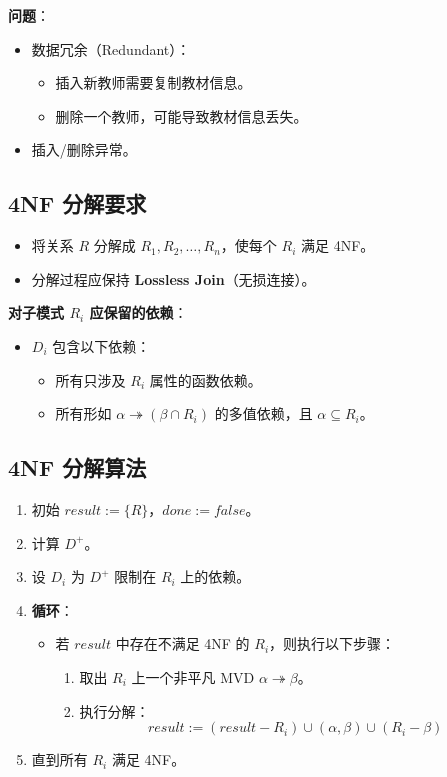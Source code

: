 \textbf{问题}：

\begin{itemize}
    \item 数据冗余（Redundant）：
    \begin{itemize}
        \item 插入新教师需要复制教材信息。
        \item 删除一个教师，可能导致教材信息丢失。
    \end{itemize}
    \item 插入/删除异常。
\end{itemize}

\subsection{4NF 分解要求}

\begin{itemize}
    \item 将关系 $R$ 分解成 $R_1, R_2, \ldots, R_n$，使每个 $R_i$ 满足 4NF。
    \item 分解过程应保持 \textbf{Lossless Join}（无损连接）。
\end{itemize}

\textbf{对子模式 $R_i$ 应保留的依赖}：

\begin{itemize}
    \item $D_i$ 包含以下依赖：
    \begin{itemize}
        \item 所有只涉及 $R_i$ 属性的函数依赖。
        \item 所有形如 $\alpha \twoheadrightarrow (\beta \cap R_i)$ 的多值依赖，且 $\alpha \subseteq R_i$。
    \end{itemize}
\end{itemize}

\subsection{4NF 分解算法}

\begin{enumerate}
    \item 初始 $result := \{R\}$，$done := false$。
    \item 计算 $D^+$。
    \item 设 $D_i$ 为 $D^+$ 限制在 $R_i$ 上的依赖。
    \item \textbf{循环}：
    \begin{itemize}
        \item 若 $result$ 中存在不满足 4NF 的 $R_i$，则执行以下步骤：
        \begin{enumerate}
            \item 取出 $R_i$ 上一个非平凡 MVD $\alpha \twoheadrightarrow \beta$。
            \item 执行分解：
            \[
            result := (result - R_i) \cup (\alpha, \beta) \cup (R_i - \beta)
            \]
        \end{enumerate}
    \end{itemize}
    \item 直到所有 $R_i$ 满足 4NF。
\end{enumerate}

